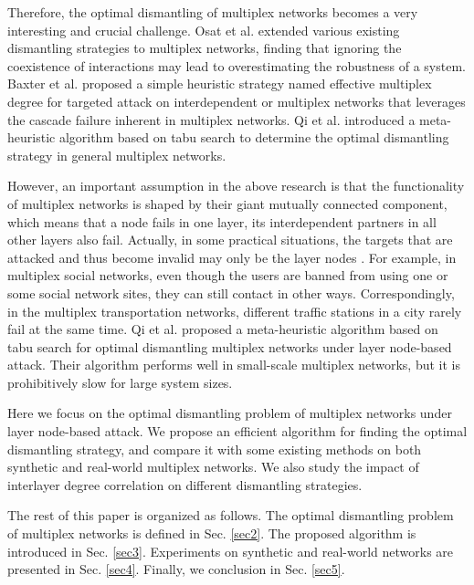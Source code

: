 \documentclass[%
 aip,
 cha,
 amsmath,amssymb,
 reprint,%
]{revtex4-1}
\begin{document}
Therefore, the optimal dismantling of multiplex networks becomes a very interesting and crucial challenge. Osat et al. \cite{Osat2017} extended various existing dismantling strategies to multiplex networks, finding that ignoring the coexistence of interactions may lead to overestimating the robustness of a system. %
Baxter et al. \cite{PhysRevE.98.032307} proposed a simple heuristic strategy named effective multiplex degree for targeted attack on interdependent or multiplex networks that leverages the cascade failure inherent in multiplex networks. Qi et al. \cite{doi:10.1063/1.5078449} introduced a meta-heuristic algorithm based on tabu search to determine the optimal dismantling strategy in general multiplex networks.

However, an important assumption in the above research is that the functionality of multiplex networks is shaped by their giant mutually connected component, which means that a node fails in one layer, its interdependent partners in all other layers also fail. Actually, in some practical situations, the targets that are attacked and thus become invalid may only be the layer nodes \cite{Zhao2016}. For example, in multiplex social networks, even though the users are banned from using one or some social network sites, they can still contact in other ways. Correspondingly, in the multiplex transportation networks, different traffic stations in a city rarely fail at the same time. Qi et al. proposed a meta-heuristic algorithm based on tabu search for optimal dismantling multiplex networks under layer node-based attack. Their algorithm performs well in small-scale multiplex networks, but it is prohibitively slow for large system sizes.

Here we focus on the optimal dismantling problem of multiplex networks under layer node-based attack. We propose an efficient algorithm for finding the optimal dismantling strategy, and compare it with some existing methods on both synthetic and real-world multiplex networks. We also study the impact of interlayer degree correlation on different dismantling strategies.

The rest of this paper is organized as follows. The optimal dismantling problem of multiplex networks is defined in Sec. \ref{sec2}. The proposed algorithm is introduced in Sec. \ref{sec3}. Experiments on synthetic and real-world networks are presented in Sec. \ref{sec4}. Finally, we conclusion in Sec. \ref{sec5}. 
\end{document}
